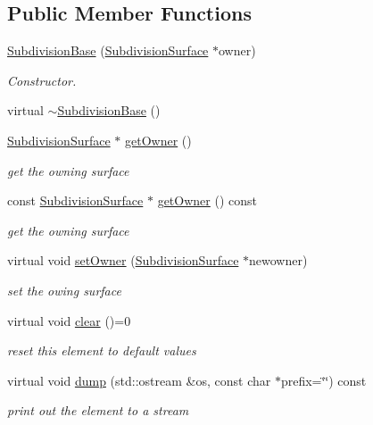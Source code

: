 \subsection*{Public Member Functions}
\begin{DoxyCompactItemize}
\item 
\hyperlink{classShipCAD_1_1SubdivisionBase_ad424b99e73d138f565a152ed0ee648cb}{Subdivision\+Base} (\hyperlink{classShipCAD_1_1SubdivisionSurface}{Subdivision\+Surface} $\ast$owner)
\begin{DoxyCompactList}\small\item\em Constructor. \end{DoxyCompactList}\item 
virtual \hyperlink{classShipCAD_1_1SubdivisionBase_a12b4adebcd9fb52d4d82d9ff469e144d}{$\sim$\+Subdivision\+Base} ()
\item 
\hyperlink{classShipCAD_1_1SubdivisionSurface}{Subdivision\+Surface} $\ast$ \hyperlink{classShipCAD_1_1SubdivisionBase_a0b9a68b5c7e6a20cf52a465f2387ffba}{get\+Owner} ()
\begin{DoxyCompactList}\small\item\em get the owning surface \end{DoxyCompactList}\item 
const \hyperlink{classShipCAD_1_1SubdivisionSurface}{Subdivision\+Surface} $\ast$ \hyperlink{classShipCAD_1_1SubdivisionBase_a8e98f69a132bcc75a0f6515b7a8a80f5}{get\+Owner} () const 
\begin{DoxyCompactList}\small\item\em get the owning surface \end{DoxyCompactList}\item 
virtual void \hyperlink{classShipCAD_1_1SubdivisionBase_a8f64480f79c9260facc2d27cd19a36ed}{set\+Owner} (\hyperlink{classShipCAD_1_1SubdivisionSurface}{Subdivision\+Surface} $\ast$newowner)
\begin{DoxyCompactList}\small\item\em set the owing surface \end{DoxyCompactList}\item 
virtual void \hyperlink{classShipCAD_1_1SubdivisionBase_a851bb7f1931f9dd6e53b6f9df7b5b352}{clear} ()=0
\begin{DoxyCompactList}\small\item\em reset this element to default values \end{DoxyCompactList}\item 
virtual void \hyperlink{classShipCAD_1_1SubdivisionBase_a7807e64ac8d2acc3da572e03cf0523b6}{dump} (std\+::ostream \&os, const char $\ast$prefix=\char`\"{}\char`\"{}) const 
\begin{DoxyCompactList}\small\item\em print out the element to a stream \end{DoxyCompactList}\end{DoxyCompactItemize}
